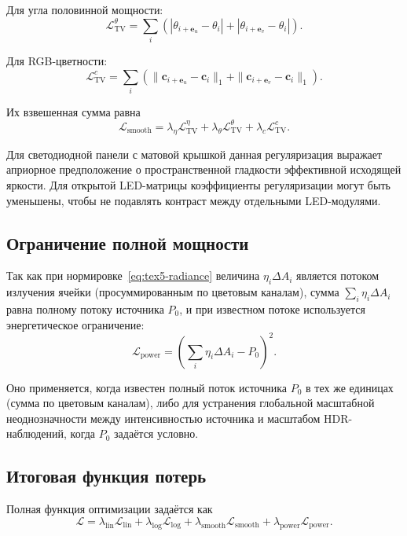 Для угла половинной мощности:
\begin{equation}
\mathcal{L}_{\mathrm{TV}}^\theta
=
\sum_i
\left(
|\theta_{i+\mathbf{e}_u}-\theta_i|
+
|\theta_{i+\mathbf{e}_v}-\theta_i|
\right).
\end{equation}

Для RGB-цветности:
\begin{equation}
\mathcal{L}_{\mathrm{TV}}^c
=
\sum_i
\left(
\|\mathbf{c}_{i+\mathbf{e}_u}-\mathbf{c}_i\|_1
+
\|\mathbf{c}_{i+\mathbf{e}_v}-\mathbf{c}_i\|_1
\right).
\end{equation}

Их взвешенная сумма равна
\begin{equation}
\mathcal{L}_{\mathrm{smooth}}
=
\lambda_\eta\mathcal{L}_{\mathrm{TV}}^\eta
+
\lambda_\theta\mathcal{L}_{\mathrm{TV}}^\theta
+
\lambda_c\mathcal{L}_{\mathrm{TV}}^c.
\end{equation}

Для светодиодной панели с матовой крышкой данная регуляризация выражает априорное предположение о пространственной гладкости эффективной исходящей яркости. Для открытой LED-матрицы коэффициенты регуляризации могут быть уменьшены, чтобы не подавлять контраст между отдельными LED-модулями.

\subsection{Ограничение полной мощности}

Так как при нормировке~\eqref{eq:tex5-radiance} величина $\eta_i\Delta A_i$ является потоком излучения ячейки (просуммированным по цветовым каналам), сумма $\sum_i\eta_i\Delta A_i$ равна полному потоку источника $P_0$, и при известном потоке используется энергетическое ограничение:
\begin{equation}
\mathcal{L}_{\mathrm{power}}
=
\left(
\sum_i\eta_i\Delta A_i-P_0
\right)^2.
\end{equation}

Оно применяется, когда известен полный поток источника $P_0$ в тех же единицах (сумма по цветовым каналам), либо для устранения глобальной масштабной неоднозначности между интенсивностью источника и масштабом HDR-наблюдений, когда $P_0$ задаётся условно.

\subsection{Итоговая функция потерь}

Полная функция оптимизации задаётся как
\begin{equation}
\mathcal{L}
=
\lambda_{\mathrm{lin}}\mathcal{L}_{\mathrm{lin}}
+
\lambda_{\log}\mathcal{L}_{\log}
+
\lambda_{\mathrm{smooth}}\mathcal{L}_{\mathrm{smooth}}
+
\lambda_{\mathrm{power}}\mathcal{L}_{\mathrm{power}}.
\end{equation}

